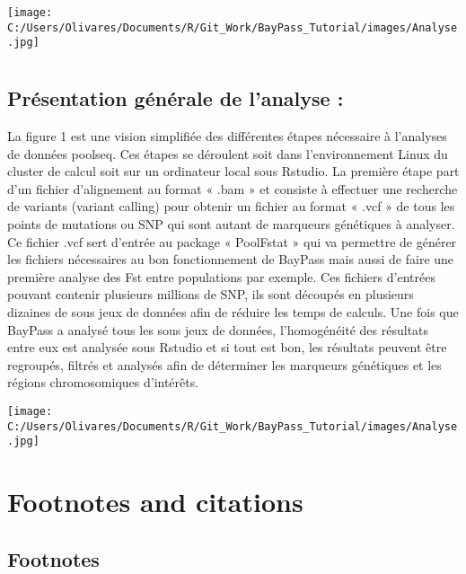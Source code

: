\documentclass[
  openany]{book}
\theoremstyle{definition}
\theoremstyle{definition}
\theoremstyle{definition}
\theoremstyle{definition}
\theoremstyle{remark}
\begin{document}
\texttt{[image: C:/Users/Olivares/Documents/R/Git\_Work/BayPass\_Tutorial/images/Analyse.jpg]}

\hypertarget{section}{%
\chapter*{}\label{section}}

\hypertarget{pruxe9sentation-guxe9nuxe9rale-de-lanalyse-1}{%
\section*{Présentation générale de l'analyse :}\label{pruxe9sentation-guxe9nuxe9rale-de-lanalyse-1}}

La figure 1 est une vision simplifiée des différentes étapes nécessaire à l'analyses de données poolseq. Ces étapes se déroulent soit dans l'environnement Linux du cluster de calcul soit sur un ordinateur local sous Rstudio.
La première étape part d'un fichier d'alignement au format « .bam » et consiste à effectuer une recherche de variants (variant calling) pour obtenir un fichier au format « .vcf » de tous les points de mutations ou SNP qui sont autant de marqueurs génétiques à analyser. Ce fichier .vcf sert d'entrée au package « PoolFstat » qui va permettre de générer les fichiers nécessaires au bon fonctionnement de BayPass mais aussi de faire une première analyse des Fst entre populations par exemple. Ces fichiers d'entrées pouvant contenir plusieurs millions de SNP, ils sont découpés en plusieurs dizaines de sous jeux de données afin de réduire les temps de calculs. Une fois que BayPass a analysé tous les sous jeux de données, l'homogénéité des résultats entre eux est analysée sous Rstudio et si tout est bon, les résultats peuvent être regroupés, filtrés et analysés afin de déterminer les marqueurs génétiques et les régions chromosomiques d'intérêts.

\texttt{[image: C:/Users/Olivares/Documents/R/Git\_Work/BayPass\_Tutorial/images/Analyse.jpg]}

\hypertarget{footnotes-and-citations}{%
\chapter{Footnotes and citations}\label{footnotes-and-citations}}

\hypertarget{footnotes}{%
\section{Footnotes}\label{footnotes}}
\end{document}
